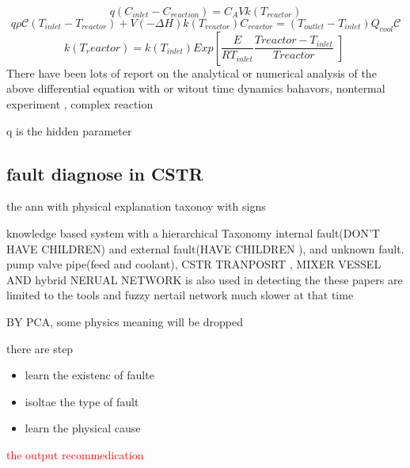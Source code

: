 \documentclass[fleqn,10pt]{wlscirep}
\newcommand{\ydnote}[1]{\textcolor{red}{#1}}
\begin{document}
\begin{equation}
    q(C_{inlet}-C_{reaction})=C_A Vk(T_{reactor})
\end{equation}
\begin{equation} 
    q \rho \mathcal{C}(T_{inlet}-T_{reactor})+V(-\Delta H)k(T_{reactor}) C_{reactor}=(T_{outlet}-T_{inlet})Q_{cool} \mathcal{C}
\end{equation}
\begin{equation} 
    k(T_reactor)=k(T_{inlet})Exp\left[\frac{E}{RT_{inlet}} \frac{T{reactor}-T_{inlet}}{T{reactor}}\left]
\end{equation}
There have been lots of report on the analytical or numerical analysis of the above differential equation with or witout time \cite{balakotaiah1981analysis}  dynamics bahavors\cite{schmidt1981dynamic}, nontermal \cite{hamer1981dynamic} experiment\cite{teymour1989dynamic,teymour1992dynamic} ,\cite{teymour1992dynamic2}
complex reaction \cite{scott1983reversible,lin1981multiplicity}

q is the hidden parameter





\subsection*{fault diagnose in CSTR }
the ann\cite{hoskins1991fault} with physical explanation
taxonoy with signs\cite{chang1990line}

knowledge based system with a hierarchical Taxonomy  \cite{terpstra1992real}
internal fault(DON'T HAVE CHILDREN) and external fault(HAVE CHILDREN ), and unknown fault. pump valve pipe(feed and coolant), CSTR TRANPOSRT , MIXER VESSEL AND 
hybrid NERUAL NETWORK is also used in detecting the \cite{ozyurt1996hybrid}
these papers are  limited to the tools and 
fuzzy nertail network\cite{zhang1996process} much slower at that time

BY PCA, some physics meaning will be dropped 

there are step
\begin{itemize}
    \item learn the existenc of faulte
    \item isoltae the type of fault
    \item learn the physical cause
\end{itemize}

\ydnote{the output recommedication }


\end{document}
